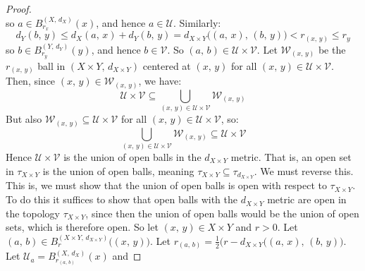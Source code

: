 \documentclass{article}
\theoremstyle{plain}
\theoremstyle{normal}
\begin{document}
\begin{proof}
\begin{equation}
            \end{equation}
            so $a\in{B}_{r_{x}}^{(X,\,d_{X})}(x)$, and hence
            $a\in\mathcal{U}$. Similarly:
            \begin{equation}
                d_{Y}(b,\,y)
                \leq{d}_{X}(a,\,x)+d_{Y}(b,\,y)
                =d_{X\times{Y}}\big((a,\,x),\,(b,\,y)\big)
                <r_{(x,\,y)}\leq{r}_{y}
            \end{equation}
            so $b\in{B}_{r_{y}}^{(Y,\,d_{Y})}(y)$, and hence
            $b\in\mathcal{V}$. So
            $(a,\,b)\in\mathcal{U}\times\mathcal{V}$. Let
            $\mathcal{W}_{(x,\,y)}$ be the $r_{(x,\,y)}$ ball in
            $(X\times{Y},\,d_{X\times{Y}})$ centered at $(x,\,y)$ for all
            $(x,\,y)\in\mathcal{U}\times\mathcal{V}$. Then, since
            $(x,\,y)\in\mathcal{W}_{(x,\,y)}$, we have:
            \begin{equation}
                \mathcal{U}\times\mathcal{V}
                \subseteq
                \bigcup_{(x,\,y)\in\mathcal{U}\times\mathcal{V}}
                    \mathcal{W}_{(x,\,y)}
            \end{equation}
            But also
            $\mathcal{W}_{(x,\,y)}\subseteq\mathcal{U}\times\mathcal{V}$
            for all $(x,\,y)\in\mathcal{U}\times\mathcal{V}$, so:
            \begin{equation}
                \bigcup_{(x,\,y)\in\mathcal{U}\times\mathcal{V}}
                    \mathcal{W}_{(x,\,y)}
                \subseteq
                \mathcal{U}\times\mathcal{V}
            \end{equation}
            Hence $\mathcal{U}\times\mathcal{V}$ is the union of open balls
            in the $d_{X\times{Y}}$ metric. That is, an open set in
            $\tau_{X\times{Y}}$ is the union of open balls, meaning
            $\tau_{X\times{Y}}\subseteq\tau_{d_{X\times{Y}}}$. We must reverse
            this. This is, we must show that the union of open balls is open
            with respect to $\tau_{X\times{Y}}$. To do this it suffices to show
            that open balls with the $d_{X\times{Y}}$ metric are open in
            the topology $\tau_{X\times{Y}}$, since then the union of open
            balls would be the union of open sets, which is therefore open.
            So let $(x,\,y)\in{X}\times{Y}$ and $r>0$. Let
            $(a,\,b)\in{B}_{r}^{(X\times{Y},\,d_{X\times{Y}})}\big((x,\,y)\big)$.
            Let $r_{(a,\,b)}=\frac{1}{2}\big(r-d_{X\times{Y}}\big((a,\,x),\,(b,\,y)\big)$.
            Let $\mathcal{U}_{a}=B_{r_{(a,\,b)}}^{(X,\,d_{X})}(x)$ and

\end{proof}
\end{document}
